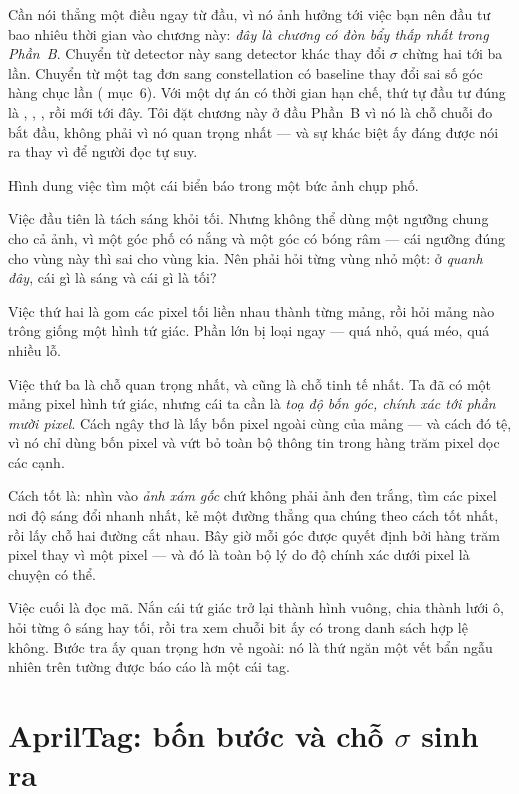 \documentclass[../../marker.tex]{subfiles}
\begin{document}
Cần nói thẳng một điều ngay từ đầu, vì nó ảnh hưởng tới việc bạn nên đầu tư bao nhiêu thời gian vào chương này: \emph{đây là chương có đòn bẩy thấp nhất trong Phần~B}. Chuyển từ detector này sang detector khác thay đổi \(\sigma\) chừng hai tới ba lần. Chuyển từ một tag đơn sang constellation có baseline thay đổi sai số góc hàng chục lần ( mục~6). Với một dự án có thời gian hạn chế, thứ tự đầu tư đúng là , , , rồi mới tới đây. Tôi đặt chương này ở đầu Phần~B vì nó là chỗ chuỗi đo bắt đầu, không phải vì nó quan trọng nhất --- và sự khác biệt ấy đáng được nói ra thay vì để người đọc tự suy.

\begin{trucgiac}
Hình dung việc tìm một cái biển báo trong một bức ảnh chụp phố.

Việc đầu tiên là tách sáng khỏi tối. Nhưng không thể dùng một ngưỡng chung cho cả ảnh, vì một góc phố có nắng và một góc có bóng râm --- cái ngưỡng đúng cho vùng này thì sai cho vùng kia. Nên phải hỏi từng vùng nhỏ một: ở \emph{quanh đây}, cái gì là sáng và cái gì là tối?

Việc thứ hai là gom các pixel tối liền nhau thành từng mảng, rồi hỏi mảng nào trông giống một hình tứ giác. Phần lớn bị loại ngay --- quá nhỏ, quá méo, quá nhiều lỗ.

Việc thứ ba là chỗ quan trọng nhất, và cũng là chỗ tinh tế nhất. Ta đã có một mảng pixel hình tứ giác, nhưng cái ta cần là \emph{toạ độ bốn góc, chính xác tới phần mười pixel}. Cách ngây thơ là lấy bốn pixel ngoài cùng của mảng --- và cách đó tệ, vì nó chỉ dùng bốn pixel và vứt bỏ toàn bộ thông tin trong hàng trăm pixel dọc các cạnh.

Cách tốt là: nhìn vào \emph{ảnh xám gốc} chứ không phải ảnh đen trắng, tìm các pixel nơi độ sáng đổi nhanh nhất, kẻ một đường thẳng qua chúng theo cách tốt nhất, rồi lấy chỗ hai đường cắt nhau. Bây giờ mỗi góc được quyết định bởi hàng trăm pixel thay vì một pixel --- và đó là toàn bộ lý do độ chính xác dưới pixel là chuyện có thể.

Việc cuối là đọc mã. Nắn cái tứ giác trở lại thành hình vuông, chia thành lưới ô, hỏi từng ô sáng hay tối, rồi tra xem chuỗi bit ấy có trong danh sách hợp lệ không. Bước tra ấy quan trọng hơn vẻ ngoài: nó là thứ ngăn một vết bẩn ngẫu nhiên trên tường được báo cáo là một cái tag.
\end{trucgiac}

\section{AprilTag: bốn bước và chỗ \texorpdfstring{\(\sigma\)}{sigma} sinh ra}
\end{document}
